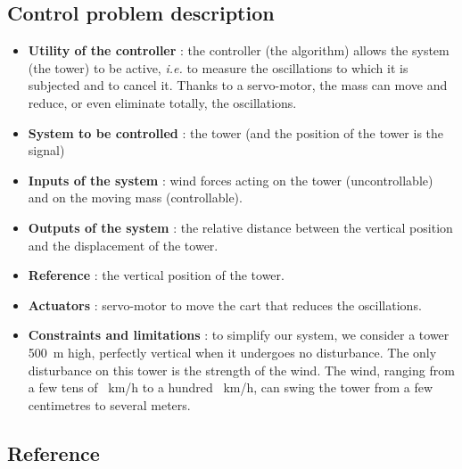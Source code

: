 \documentclass[a4paper, 12pt]{article}
\begin{document}
    \subsection{Control problem description}
    \begin{itemize}
        \item {\bf Utility of the controller} : the controller (the algorithm) allows the system (the tower) to be active, {\it i.e.} to measure the oscillations to which it is subjected and to cancel it. Thanks to a servo-motor, the mass can move and reduce, or even eliminate totally, the oscillations.
        \item {\bf System to be controlled} : the tower (and the position of the tower is the signal)
        \item {\bf Inputs of the system} : wind forces acting on the tower (uncontrollable) and on the moving mass (controllable).
        \item {\bf Outputs of the system} : the relative distance between the vertical position and the displacement of the tower.
        \item {\bf Reference} : the vertical position of the tower.
        \item {\bf Actuators} : servo-motor to move the cart that reduces the oscillations.
        \item {\bf Constraints and limitations} : to simplify our system, we consider a tower \SI{500}{\meter} high, perfectly vertical when it undergoes no disturbance. The only disturbance on this tower is the strength of the wind. The wind, ranging from a few tens of \SI{}{\kilo\meter/\hour} to a hundred \SI{}{\kilo\meter/\hour}, can swing the tower from a few centimetres to several meters.
    \end{itemize}
    
    \newpage
    \subsection{Reference}
    \nocite{*}
    \printbibliography
\end{document}
